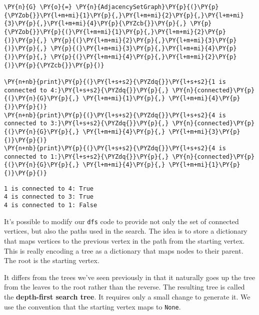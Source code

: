 \begin{Verbatim}[commandchars=\\\{\}]
\PY{n}{G} \PY{o}{=} \PY{n}{AdjacencySetGraph}\PY{p}{(}\PY{p}{\PYZob{}}\PY{l+m+mi}{1}\PY{p}{,}\PY{l+m+mi}{2}\PY{p}{,}\PY{l+m+mi}{3}\PY{p}{,}\PY{l+m+mi}{4}\PY{p}{\PYZcb{}}\PY{p}{,} \PY{p}{\PYZob{}}\PY{p}{(}\PY{l+m+mi}{1}\PY{p}{,}\PY{l+m+mi}{2}\PY{p}{)}\PY{p}{,} \PY{p}{(}\PY{l+m+mi}{2}\PY{p}{,}\PY{l+m+mi}{3}\PY{p}{)}\PY{p}{,} \PY{p}{(}\PY{l+m+mi}{3}\PY{p}{,}\PY{l+m+mi}{4}\PY{p}{)}\PY{p}{,} \PY{p}{(}\PY{l+m+mi}{4}\PY{p}{,}\PY{l+m+mi}{2}\PY{p}{)}\PY{p}{\PYZcb{}}\PY{p}{)}

\PY{n+nb}{print}\PY{p}{(}\PY{l+s+s2}{\PYZdq{}}\PY{l+s+s2}{1 is connected to 4:}\PY{l+s+s2}{\PYZdq{}}\PY{p}{,} \PY{n}{connected}\PY{p}{(}\PY{n}{G}\PY{p}{,} \PY{l+m+mi}{1}\PY{p}{,} \PY{l+m+mi}{4}\PY{p}{)}\PY{p}{)}
\PY{n+nb}{print}\PY{p}{(}\PY{l+s+s2}{\PYZdq{}}\PY{l+s+s2}{4 is connected to 3:}\PY{l+s+s2}{\PYZdq{}}\PY{p}{,} \PY{n}{connected}\PY{p}{(}\PY{n}{G}\PY{p}{,} \PY{l+m+mi}{4}\PY{p}{,} \PY{l+m+mi}{3}\PY{p}{)}\PY{p}{)}
\PY{n+nb}{print}\PY{p}{(}\PY{l+s+s2}{\PYZdq{}}\PY{l+s+s2}{4 is connected to 1:}\PY{l+s+s2}{\PYZdq{}}\PY{p}{,} \PY{n}{connected}\PY{p}{(}\PY{n}{G}\PY{p}{,} \PY{l+m+mi}{4}\PY{p}{,} \PY{l+m+mi}{1}\PY{p}{)}\PY{p}{)}
\end{Verbatim}

\begin{Verbatim}
1 is connected to 4: True
4 is connected to 3: True
4 is connected to 1: False

\end{Verbatim}


It's possible to modify our \texttt{dfs} code to provide not only the set of connected vertices, but also the paths used in the search.
The idea is to store a dictionary that maps vertices to the previous vertex in the path from the starting vertex.
This is really encoding a tree as a dictionary that maps nodes to their parent.
The root is the starting vertex.


It differs from the trees we've seen previously in that it naturally goes up the tree from the leaves to the root rather than the reverse.
The resulting tree is called the \textbf{depth-first search tree}.
It requires only a small change to generate it.
We use the convention that the starting vertex maps to \texttt{None}.

